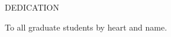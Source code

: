 \newpage
{}

\begin{center}
DEDICATION
\end{center}

\begin{center}
To all graduate students by heart and name.
\end{center}
